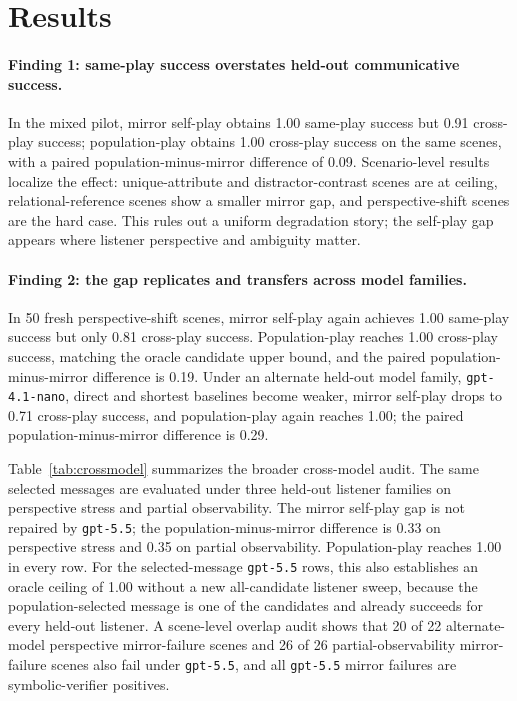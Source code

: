 \documentclass[10pt]{article}
\begin{document}
\section{Results}

\paragraph{Finding 1: same-play success overstates held-out communicative success.}
In the mixed pilot, mirror self-play obtains 1.00 same-play success but 0.91 cross-play success; population-play obtains 1.00 cross-play success on the same scenes, with a paired population-minus-mirror difference of 0.09. Scenario-level results localize the effect: unique-attribute and distractor-contrast scenes are at ceiling, relational-reference scenes show a smaller mirror gap, and perspective-shift scenes are the hard case. This rules out a uniform degradation story; the self-play gap appears where listener perspective and ambiguity matter.

\paragraph{Finding 2: the gap replicates and transfers across model families.}
In 50 fresh perspective-shift scenes, mirror self-play again achieves 1.00 same-play success but only 0.81 cross-play success. Population-play reaches 1.00 cross-play success, matching the oracle candidate upper bound, and the paired population-minus-mirror difference is 0.19. Under an alternate held-out model family, \texttt{gpt-4.1-nano}, direct and shortest baselines become weaker, mirror self-play drops to 0.71 cross-play success, and population-play again reaches 1.00; the paired population-minus-mirror difference is 0.29.

Table~\ref{tab:crossmodel} summarizes the broader cross-model audit. The same selected messages are evaluated under three held-out listener families on perspective stress and partial observability. The mirror self-play gap is not repaired by \texttt{gpt-5.5}; the population-minus-mirror difference is 0.33 on perspective stress and 0.35 on partial observability. Population-play reaches 1.00 in every row. For the selected-message \texttt{gpt-5.5} rows, this also establishes an oracle ceiling of 1.00 without a new all-candidate listener sweep, because the population-selected message is one of the candidates and already succeeds for every held-out listener. A scene-level overlap audit shows that 20 of 22 alternate-model perspective mirror-failure scenes and 26 of 26 partial-observability mirror-failure scenes also fail under \texttt{gpt-5.5}, and all \texttt{gpt-5.5} mirror failures are symbolic-verifier positives.
\end{document}
